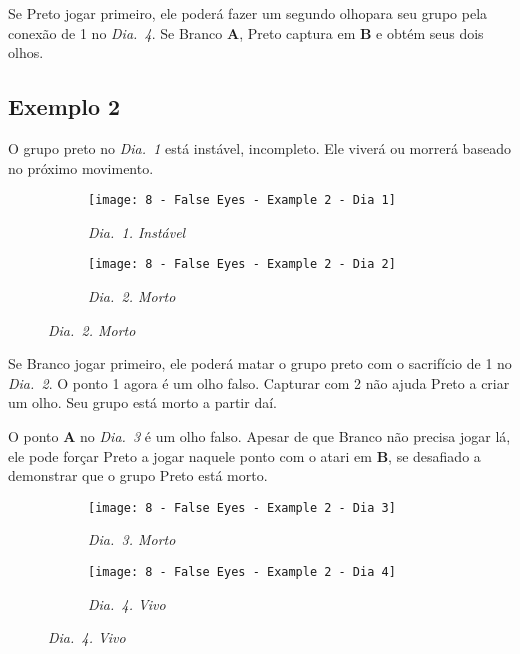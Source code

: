 Se Preto jogar primeiro, ele poderá fazer um segundo olhopara seu grupo pela conexão de 1 no \emph{Dia.\@~4}. Se Branco \textbf{A}, Preto captura em \textbf{B} e obtém seus dois olhos.

\subsection{Exemplo 2}

O grupo preto no \emph{Dia.\@~1} está instável, incompleto. Ele viverá ou morrerá baseado no próximo movimento.

\begin{figure}[h!]
    \centering
    \begin{subfigure}[t]{.31\textwidth}
        \texttt{[image: 8 - False Eyes - Example 2 - Dia 1]}
        \caption*{\emph{Dia.\@~1. Instável}}
    \end{subfigure}
    \hspace{1cm}
    \begin{subfigure}[t]{.31\textwidth}
        \texttt{[image: 8 - False Eyes - Example 2 - Dia 2]}
        \caption*{\emph{Dia.\@~2. Morto}}
    \end{subfigure}
\end{figure}

Se Branco jogar primeiro, ele poderá matar o grupo preto com o sacrifício de 1 no \emph{Dia.\@~2}. O ponto 1 agora é um olho falso. Capturar com 2 não ajuda Preto a criar um olho. Seu grupo está morto a partir daí.

O ponto \textbf{A} no \emph{Dia.\@~3} é um olho falso. Apesar de que Branco não precisa jogar lá, ele pode forçar Preto a jogar naquele ponto com o atari em \textbf{B}, se desafiado a demonstrar que o grupo Preto está morto.

\begin{figure}[h!]
    \centering
    \begin{subfigure}[t]{.31\textwidth}
        \texttt{[image: 8 - False Eyes - Example 2 - Dia 3]}
        \caption*{\emph{Dia.\@~3. Morto}}
    \end{subfigure}
    \hspace{1cm}
    \begin{subfigure}[t]{.31\textwidth}
        \texttt{[image: 8 - False Eyes - Example 2 - Dia 4]}
        \caption*{\emph{Dia.\@~4. Vivo}}
    \end{subfigure}
\end{figure}

